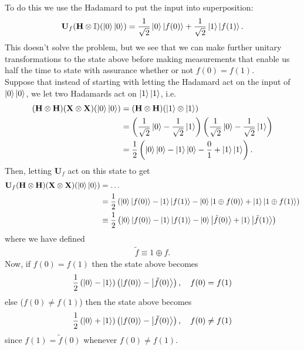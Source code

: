\documentclass{book}
\theoremstyle{definition}
\newcommand{\nn}{\nonumber}
\newcommand{\X}{\mathbf{X}}
\newcommand{\f}[2]{\frac{#1}{#2}}
\newcommand{\lp}{\left(}
\newcommand{\rp}{\right)}
\newcommand{\Id}{\mathbb{I}}
\newcommand{\had}{\mathbf{H}}
\begin{document}
To do this we use the Hadamard to put the input into superposition:
\begin{align}
\mathbf{U}_f (\had \otimes \Id) (\ket{0}\ket{0}) = \f{1}{\sqrt{2}}\ket{0}\ket{f(0)} + \f{1}{\sqrt{2}}\ket{1}\ket{f(1)}.
\end{align}
This doesn't solve the problem, but we see that we can make further unitary transformations to the state above before making measurements that enable us half the time to state with assurance whether or not $f(0) = f(1)$. \\

Suppose that instead of starting with letting the Hadamard act on the input of $\ket{0}\ket{0}$, we let two Hadamards act on $\ket{1}\ket{1}$, i.e. 
\begin{align}
(\had\otimes \had)(\X \otimes \X)(\ket{0}\ket{0}) &= (\had \otimes \had)(\ket{1}\otimes \ket{1})\nn\\
&= \lp\f{1}{\sqrt{2}}\ket{0} - \f{1}{\sqrt{2}}\ket{1} \rp \lp\f{1}{\sqrt{2}}\ket{0} - \f{1}{\sqrt{2}}\ket{1} \rp \nn\\
&= \f{1}{2}\lp \ket{0}\ket{0} - \ket{1}\ket{0} - \f{0}{1} + \ket{1}\ket{1} \rp.
\end{align}
Then, letting $\mathbf{U}_f$ act on this state to get
\begin{align}
\mathbf{U}_f (\had\otimes \had)(\X \otimes \X)(\ket{0}\ket{0}) &= \dots\nn\\
&= \f{1}{2}\lp \ket{0}\ket{f(0)} - \ket{1}\ket{f(1)} - \ket{0}\ket{1 \oplus {f}(0)} + \ket{1}\ket{1\oplus {f}(1)} \rp\nn\\
&\equiv \f{1}{2}\lp \ket{0}\ket{f(0)} - \ket{1}\ket{f(1)} - \ket{0}\ket{\tilde{f}(0)} + \ket{1}\ket{\tilde{f}(1)} \rp
\end{align}
where we have defined
\begin{align}
\tilde{f} \equiv 1 \oplus f.
\end{align}
Now, if $f(0) = f(1)$ then the state above becomes
\begin{align}
\f{1}{2}\lp \ket{0} - \ket{1} \rp \lp \ket{f(0)} - \ket{\tilde{f}(0)} \rp, \quad f(0) = f(1)
\end{align}
else ($f(0) \neq f(1)$) then the state above becomes
\begin{align}
\f{1}{2}\lp \ket{0} + \ket{1} \rp \lp \ket{f(0)} - \ket{\tilde{f}(0)} \rp, \quad f(0) \neq f(1)
\end{align}
since $f(1) = \tilde{f}(0)$ whenever $f(0) \neq f(1)$.\\
\end{document}
